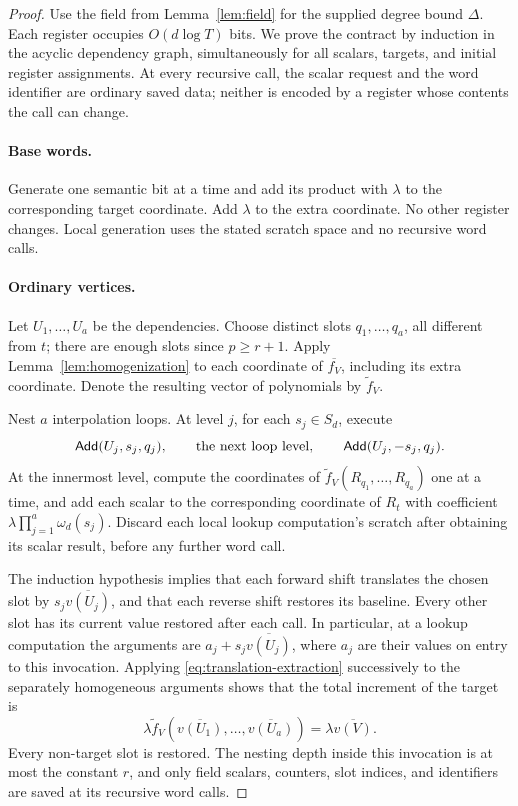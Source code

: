 \begin{proof}
Use the field from Lemma~\ref{lem:field} for the supplied degree bound
$\Delta$.  Each register occupies $O(d\log T)$ bits.  We prove the contract
by induction in the acyclic dependency graph, simultaneously for all
scalars, targets, and initial register assignments.  At every recursive
call, the scalar request and the word identifier are ordinary saved data;
neither is encoded by a register whose contents the call can change.

\paragraph{Base words.}
Generate one semantic bit at a time and add its product with $\lambda$ to
the corresponding target coordinate.  Add $\lambda$ to the extra
coordinate.  No other register changes.  Local generation uses the stated
scratch space and no recursive word calls.

\paragraph{Ordinary vertices.}
Let $U_1,\ldots,U_a$ be the dependencies.  Choose distinct slots
$q_1,\ldots,q_a$, all different from $t$; there are enough slots since
$p\ge r+1$.  Apply Lemma~\ref{lem:homogenization} to each coordinate of
$\overline{f_V}$, including its extra coordinate.  Denote the resulting
vector of polynomials by $\widetilde f_V$.

Nest $a$ interpolation loops.  At level $j$, for each $s_j\in S_d$, execute
\[
 \mathsf{Add}(U_j,s_j,q_j),\qquad
 \text{the next loop level},\qquad
 \mathsf{Add}(U_j,-s_j,q_j).
\]
At the innermost level, compute the coordinates of
$\widetilde f_V(R_{q_1},\ldots,R_{q_a})$ one at a time, and add each scalar
to the corresponding coordinate of $R_t$ with coefficient
$\lambda\prod_{j=1}^a\omega_d(s_j)$.  Discard each local lookup
computation's scratch after obtaining its scalar result, before any further
word call.

The induction hypothesis implies that each forward shift translates the
chosen slot by $s_j\overline{v(U_j)}$, and that each reverse shift restores
its baseline.  Every other slot has its current value restored after each
call.  In particular, at a lookup computation the arguments are
$a_j+s_j\overline{v(U_j)}$, where $a_j$ are their values on entry to this
invocation.  Applying \eqref{eq:translation-extraction} successively to the
separately homogeneous arguments shows that the total increment of the
target is
\[
 \lambda\widetilde f_V
    (\overline{v(U_1)},\ldots,\overline{v(U_a)})
 =\lambda\overline{v(V)}.
\]
Every non-target slot is restored.  The nesting depth inside this invocation
is at most the constant $r$, and only field scalars, counters, slot indices,
and identifiers are saved at its recursive word calls.


\end{proof}
